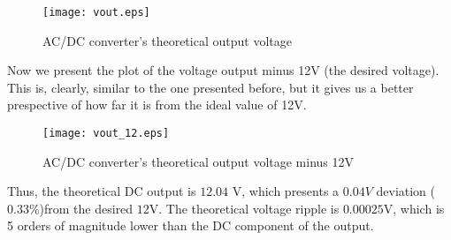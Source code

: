  \begin{figure}[h!]
   \centering
   \texttt{[image: vout.eps]}
   \caption{AC/DC converter's theoretical output voltage}
   \label{fig:VoltageRegulatorOutput}
 \end{figure}

Now we present the plot of the voltage output minus 12V (the desired voltage). This is, clearly, similar to the one presented before, but it gives us a better prespective of how far it is from the ideal value of 12V.
 \begin{figure}[h!]
   \centering
   \texttt{[image: vout\_12.eps]}
   \caption{AC/DC converter's theoretical output voltage minus 12V}
   \label{fig:VoltageRegulatorOutput}
 \end{figure}



Thus, the theoretical DC output is $12.04$ V, which presents a $0.04V$ deviation ($0.33$\%)from the desired $12$V. The theoretical voltage ripple is $0.00025$V, which is 5 orders of magnitude lower than the DC component of the output.
